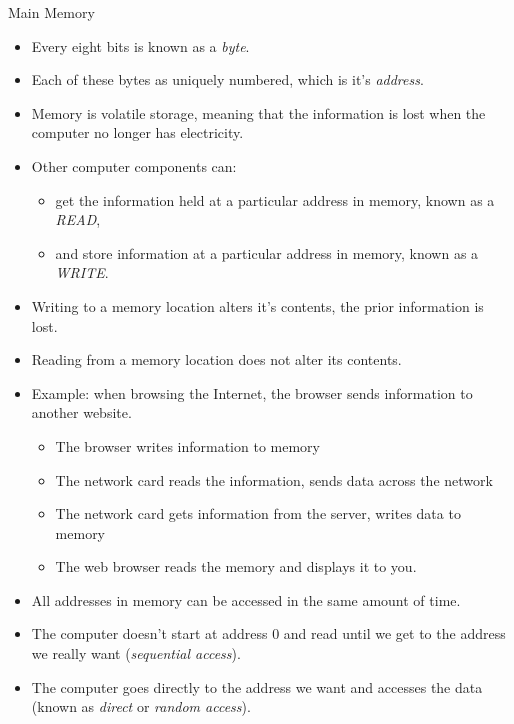 \documentclass[graphics]{beamer}
\begin{document}
\begin{frame}{Main Memory}
{    \begin{itemize}
        \item Every eight bits is known as a \textit{byte}.
        \item Each of these bytes as uniquely numbered, which is it's \textit{address}.
        \item Memory is volatile storage, meaning that the information is lost when the computer no longer has electricity.
    \end{itemize}
}
 {
    \begin{itemize}
        \item Other computer components can:
        \begin{itemize}
            \item get the information held at a particular address in memory, known as a \textit{READ},
            \item and store information at a particular address in memory, known as a \textit{WRITE}.
        \end{itemize}
        \item Writing to a memory location alters it's contents, the prior information is lost.
        \item Reading from a memory location does not alter its contents.
        \item Example: when browsing the Internet, the browser sends information to another website.
        \begin{itemize}
            \item The browser writes information to memory
            \item The network card reads the information, sends data across the network
            \item The network card gets information from the server, writes data to memory
            \item The web browser reads the memory and displays it to you.
        \end{itemize}
    \end{itemize}
}
 {
    \begin{itemize}
        \item All addresses in memory can be accessed in the same amount of time.
        \item The computer doesn't start at address 0 and read until we get to the address we really want (\textit{sequential access}).
        \item The computer goes directly to the address we want and accesses the data (known as \textit{direct} or \textit{random access}).

\end{itemize}}
\end{frame}
\end{document}
